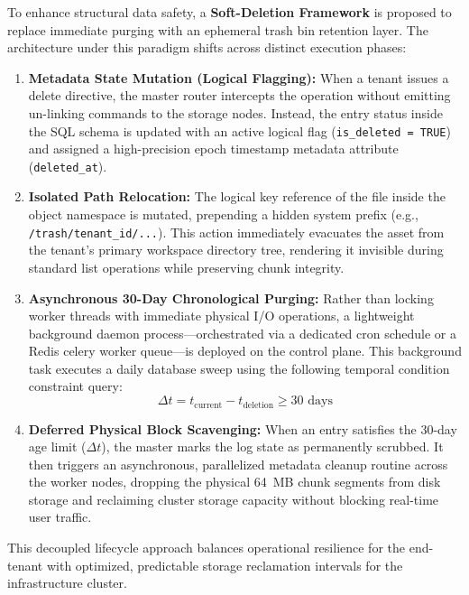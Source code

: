To enhance structural data safety, a \textbf{Soft-Deletion Framework} is proposed to replace immediate purging with an ephemeral trash bin retention layer. The architecture under this paradigm shifts across distinct execution phases:
\begin{enumerate}
    \item \textbf{Metadata State Mutation (Logical Flagging):} When a tenant issues a delete directive, the master router intercepts the operation without emitting un-linking commands to the storage nodes. Instead, the entry status inside the SQL schema is updated with an active logical flag (\texttt{is\_deleted = TRUE}) and assigned a high-precision epoch timestamp metadata attribute (\texttt{deleted\_at}).
    \item \textbf{Isolated Path Relocation:} The logical key reference of the file inside the object namespace is mutated, prepending a hidden system prefix (e.g., \texttt{/trash/tenant\_id/...}). This action immediately evacuates the asset from the tenant's primary workspace directory tree, rendering it invisible during standard list operations while preserving chunk integrity.
    \item \textbf{Asynchronous 30-Day Chronological Purging:} Rather than locking worker threads with immediate physical I/O operations, a lightweight background daemon process---orchestrated via a dedicated cron schedule or a Redis celery worker queue---is deployed on the control plane. This background task executes a daily database sweep using the following temporal condition constraint query:
    $$\Delta t = t_{\text{current}} - t_{\text{deletion}} \ge 30 \text{ days}$$
    \item \textbf{Deferred Physical Block Scavenging:} When an entry satisfies the 30-day age limit ($\Delta t$), the master marks the log state as permanently scrubbed. It then triggers an asynchronous, parallelized metadata cleanup routine across the worker nodes, dropping the physical 64~MB chunk segments from disk storage and reclaiming cluster storage capacity without blocking real-time user traffic.
\end{enumerate}
This decoupled lifecycle approach balances operational resilience for the end-tenant with optimized, predictable storage reclamation intervals for the infrastructure cluster.
